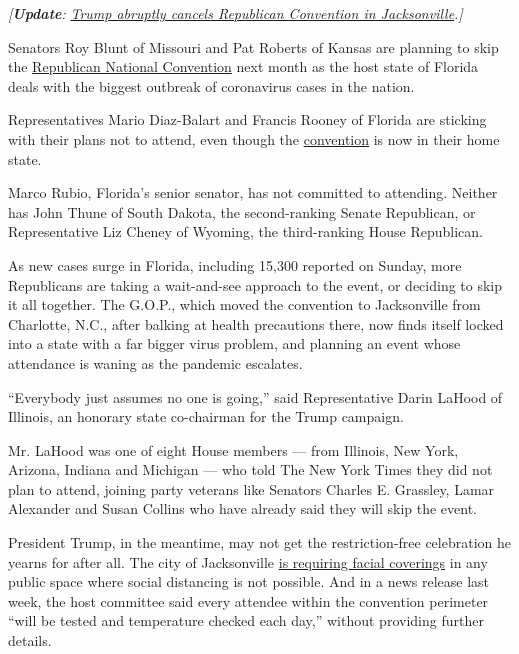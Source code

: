 \emph{{[}\textbf{\textbf{Update}}:}
\href{https://www.nytimes.com/2020/07/23/us/politics/jacksonville-rnc.html}{\emph{Trump
abruptly cancels Republican Convention in Jacksonville}}\emph{.{]}}

Senators Roy Blunt of Missouri and Pat Roberts of Kansas are planning to
skip the
\href{https://www.nytimes.com/2020/07/14/us/politics/republican-convention-jacksonville-virus-outdoors.html}{Republican
National Convention} next month as the host state of Florida deals with
the biggest outbreak of coronavirus cases in the nation.

Representatives Mario Diaz-Balart and Francis Rooney of Florida are
sticking with their plans not to attend, even though the
\href{https://www.nytimes.com/2020/07/14/us/politics/republican-convention-jacksonville-virus-outdoors.html}{convention}
is now in their home state.

Marco Rubio, Florida's senior senator, has not committed to attending.
Neither has John Thune of South Dakota, the second-ranking Senate
Republican, or Representative Liz Cheney of Wyoming, the third-ranking
House Republican.

As new cases surge in Florida, including 15,300 reported on Sunday, more
Republicans are taking a wait-and-see approach to the event, or deciding
to skip it all together. The G.O.P., which moved the convention to
Jacksonville from Charlotte, N.C., after balking at health precautions
there, now finds itself locked into a state with a far bigger virus
problem, and planning an event whose attendance is waning as the
pandemic escalates.

``Everybody just assumes no one is going,'' said Representative Darin
LaHood of Illinois, an honorary state co-chairman for the Trump
campaign.

Mr. LaHood was one of eight House members --- from Illinois, New York,
Arizona, Indiana and Michigan --- who told The New York Times they did
not plan to attend, joining party veterans like Senators Charles E.
Grassley, Lamar Alexander and Susan Collins who have already said they
will skip the event.

President Trump, in the meantime, may not get the restriction-free
celebration he yearns for after all. The city of Jacksonville
\href{https://www.nytimes.com/2020/06/29/us/politics/rnc-masks-convention.html}{is
requiring facial coverings} in any public space where social distancing
is not possible. And in a news release last week, the host committee
said every attendee within the convention perimeter ``will be tested and
temperature checked each day,'' without providing further details.

